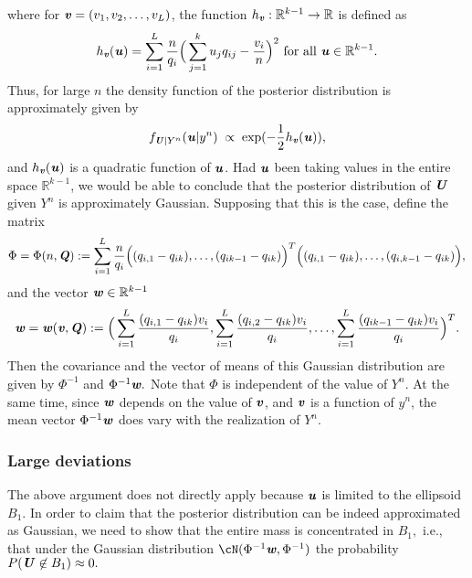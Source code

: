 \documentclass[11pt,onecolumn]{IEEEtran}
\def\mathbi#1{{\textbf{\textit #1}}}
\begin{document}
where for $\mathbi{v} = (v_1,v_2,\dots,v_L)$, the function $h_{\mathbi{v}}: \mathbb{R}^{k-1} \to \mathbb{R}$ is defined as
  \begin{equation}\label{eq:defh}
h_{\mathbi{v}}(\mathbi{u}) = \sum_{i=1}^L \frac{n}{q_i} \Big(\sum_{j=1}^k u_j q_{ij} - \frac{v_i}{n} \Big)^2 \text{~for all~} \mathbi{u} \in \mathbb{R}^{k-1}.
  \end{equation}
Thus, for large $n$ the density function of the posterior distribution is approximately given by
   $$
   f_{\mathbi{U}|Y^n}(\mathbi{u}|y^n) \;\propto\;  \exp (-\frac{1}{2}h_{\mathbi{v}}(\mathbi{u})),
   $$
    and $h_{\mathbi{v}}(\mathbi{u})$ is a quadratic function of $\mathbi{u}$. Had $\mathbi{u}$ been taking values in the entire space $\mathbb{R}^{k-1}$, we would be able to conclude that the posterior distribution of $\mathbi{U}$ given $Y^n$ is approximately Gaussian. 
Supposing that this is the case, define the matrix
$$
\Phi = \Phi(n,\mathbi{Q}) := \sum_{i=1}^L
{\frac{n}{q_i}}\Big((q_{i,1} - q_{ik}),
\dots, (q_{ik-1} - q_{ik}) \Big)^T
\Big((q_{i,1} - q_{ik}),
\dots, (q_{i,k-1} - q_{ik}) \Big),
$$
and the vector $\mathbi{w} \in \mathbb{R}^{k-1}$ 
$$
\mathbi{w}=\mathbi{w}(\mathbi{v},\mathbi{Q}) := \Big( \sum_{i=1}^L  \frac{
(q_{i,1}-q_{ik}) v_i  }{q_i}, \sum_{i=1}^L  \frac{
(q_{i,2}-q_{ik}) v_i  }{q_i}, \dots, \sum_{i=1}^L  \frac{
(q_{ik-1}-q_{ik}) v_i  }{q_i} \Big)^T.
$$
Then the covariance and the vector of means of this Gaussian distribution are given by $\Phi^{-1}$ and $\Phi^{-1}\mathbi{w}.$
Note that $\Phi$ is independent of the value of $Y^n$. {At the same time, since $\mathbi{w}$ depends on the value of $\mathbi{v}$, and $\mathbi{v}$ is a function of $y^n$, the mean vector $\Phi^{-1}\mathbi{w}$ does vary with the realization of $Y^n$.}

\vspace*{.1in}\subsubsection{Large deviations}
The above argument does not directly apply because $\mathbi{u}$ is limited to the ellipsoid $B_1$. In order to claim that the posterior distribution can be indeed approximated as Gaussian, we need to show that the entire mass is concentrated in $B_1,$ i.e., that under the Gaussian distribution $\cN(\Phi^{-1}\mathbi{w}, \Phi^{-1})$ the probability $P(\mathbi{U}\not\in B_1)\approx0.$ 
\end{document}
